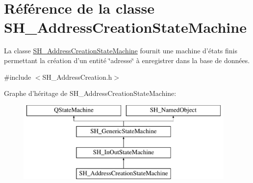 \hypertarget{classSH__AddressCreationStateMachine}{\section{Référence de la classe S\-H\-\_\-\-Address\-Creation\-State\-Machine}
\label{classSH__AddressCreationStateMachine}
}


La classe \hyperlink{classSH__AddressCreationStateMachine}{S\-H\-\_\-\-Address\-Creation\-State\-Machine} fournit une machine d'états finis permettant la création d'un entité \char`\"{}adresse\char`\"{} à enregistrer dans la base de données.  




{\ttfamily \#include $<$S\-H\-\_\-\-Address\-Creation.\-h$>$}

Graphe d'héritage de S\-H\-\_\-\-Address\-Creation\-State\-Machine\-:\begin{figure}[H]
\begin{center}
\leavevmode
\includegraphics[height=4.000000cm]{classSH__AddressCreationStateMachine}
\end{center}
\end{figure}
